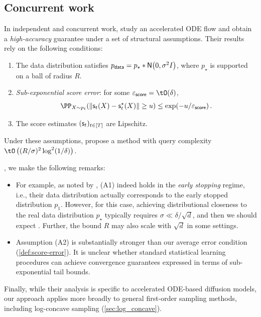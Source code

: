 
\subsection{Concurrent work}\label{sec:concurrent}
In independent and concurrent work, \citet{gatmiry2026high} study an accelerated ODE flow and  obtain a \emph{high-accuracy} guarantee under a set of structural assumptions.  Their results rely on the following conditions:
\begin{enumerate}[leftmargin=3em]
\item[(A1)] The data distribution satisfies $\pdata = p_\star * \normal{0,\sigma^2 I}$, where $p_\star$ is supported on a ball of radius $R$.
\item[(A2)] \emph{Sub-exponential score error}: for some $\epssc = \tO(\delta)$,
\[
\PP_{X \sim p_t}\!\left(\nrm{\scf_t(X) - \scfs_t(X)} \ge u\right) \le \exp(-u/\epssc)\,.
\]
\item[(A3)] The score estimates $(\mathsf{s}_t)_{t\in [T]}$ are Lipschitz.
\end{enumerate}
Under these assumptions, \citet{gatmiry2026high} propose a method with query complexity $\tO\left((R/\sigma)^2 \log^2(1/\delta)\right)$.

, we make the following remarks:
\begin{itemize}
\item {}

For example, as noted by \citet{gatmiry2026high}, (A1) indeed holds in the \emph{early stopping} regime, i.e., their data distribution actually corresponds to the early stopped distribution $p_1$. However, for this case, achieving distributional closeness to the real data distribution $p_\star$ typically requires $\sigma \ll \delta/\sqrt d$, and then we should expect . Further, the bound $R$ may also scale with $\sqrt{d}$ in some settings.
\item Assumption (A2) is substantially stronger than our average error condition (\cref{def:score-error}). It is unclear whether standard statistical learning procedures can achieve convergence guarantees expressed in terms of sub-exponential tail bounds.
\end{itemize}

Finally, while their analysis is specific to accelerated ODE-based diffusion models, our approach applies more broadly to general first-order sampling methods, including log-concave sampling (\cref{sec:log_concave}).
